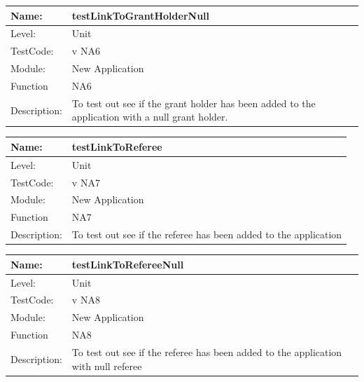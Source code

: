 \documentclass[12pt]{article}
\begin{document}
\begin{center}
\begin{tabular}{|l|p{12cm}|}
\hline

 Name: & testLinkToGrantHolderNull  \\
\hline
Level: & Unit \\
\hline
TestCode: & v NA6 \\
\hline
Module:& New Application\\
\hline
Function & NA6 \\
\hline
Description: & To test out see if the grant holder has been added to the application with a null grant holder.  \\
\hline

\end{tabular}
\end{center}

\begin{center}
\begin{tabular}{|l|p{12cm}|}
\hline

 Name: & testLinkToReferee  \\
\hline
Level: & Unit \\
\hline
TestCode: & v NA7 \\
\hline
Module:& New Application\\
\hline
Function & NA7 \\
\hline
Description: & To test out see if the referee has been added to the application  \\
\hline

\end{tabular}
\end{center}

\begin{center}
\begin{tabular}{|l|p{12cm}|}
\hline

 Name: & testLinkToRefereeNull  \\
\hline
Level: & Unit \\
\hline
TestCode: & v NA8 \\
\hline
Module:& New Application\\
\hline
Function & NA8 \\
\hline
Description: & To test out see if the referee has been added to the application with null referee  \\
\hline

\end{tabular}
\end{center}
\end{document}
